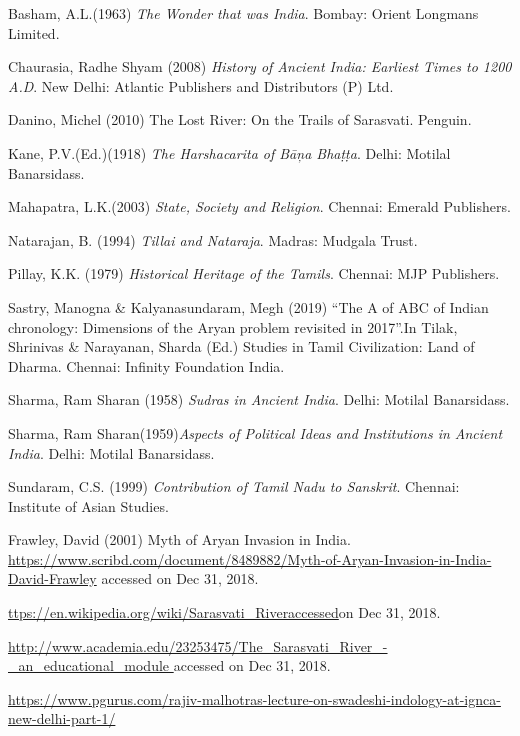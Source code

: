\begin{thebibliography}{99}
 Basham, A.L.(1963) \textit{The Wonder that was India}. Bombay: Orient Longmans Limited.

  Chaurasia, Radhe Shyam (2008) \textit{History of Ancient India: Earliest Times to 1200 A.D}. New Delhi: Atlantic Publishers and Distributors (P) Ltd.

  Danino, Michel (2010) The Lost River: On the Trails of Sarasvati. Penguin.

  Kane, P.V.(Ed.)(1918) \textit{The Harshacarita of Bāņa Bhaṭṭa}. Delhi: Motilal Banarsidass.

  Mahapatra, L.K.(2003) \textit{State, Society and Religion}. Chennai: Emerald Publishers.

  Natarajan, B. (1994) \textit{Tillai and Nataraja}. Madras: Mudgala Trust.

  Pillay, K.K. (1979) \textit{Historical Heritage of the Tamils}. Chennai: MJP Publishers.

  Sastry, Manogna \& Kalyanasundaram, Megh (2019) “The A of ABC of Indian chronology: Dimensions of the Aryan problem revisited in 2017”.In Tilak, Shrinivas \& Narayanan, Sharda (Ed.) Studies in Tamil Civilization: Land of Dharma. Chennai: Infinity Foundation India.

  Sharma, Ram Sharan (1958) \textit{Sudras in Ancient India}. Delhi: Motilal Banarsidass.

  Sharma, Ram Sharan(1959)\textit{Aspects of Political Ideas and Institutions in Ancient India}. Delhi: Motilal Banarsidass.

  Sundaram, C.S. (1999) \textit{Contribution of Tamil Nadu to Sanskrit}. Chennai: Institute of Asian Studies.

  Frawley, David (2001) Myth of Aryan Invasion in India. \url{https://www.scribd.com/document/8489882/Myth-of-Aryan-Invasion-in-India-David-Frawley} accessed on Dec 31, 2018.

  \url{ttps://en.wikipedia.org/wiki/Sarasvati_Riveraccessed}on Dec 31, 2018.

  \url{http://www.academia.edu/23253475/The_Sarasvati_River_-_an_educational_module
 } accessed on Dec 31, 2018.

  \url{https://www.pgurus.com/rajiv-malhotras-lecture-on-swadeshi-indology-at-ignca-new-delhi-part-1/
 }


\end{thebibliography}
